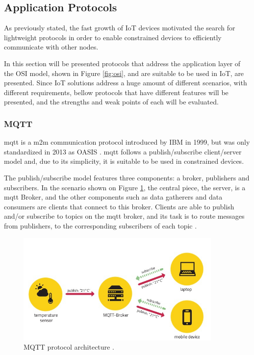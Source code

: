 \subsection{Application Protocols}

As previously stated, the fast growth of IoT devices motivated the search for lightweight protocols in order to enable constrained devices to efficiently communicate with other nodes.

In this section will be presented protocols that address the application layer of the OSI model, shown in Figure \ref{fig:osi}, and are suitable to be used in IoT, are presented. Since IoT solutions address a huge amount of different scenarios, with different requirements, bellow protocols that have different features will be presented, and the strengths and weak points of each will be evaluated.

\subsubsection{MQTT}

\acf{mqtt} is a \ac{m2m} communication protocol introduced by IBM in 1999, but was only standardized in 2013 as OASIS \cite{Al-fuqaha2015}. \ac{mqtt} follows a publish/subscribe client/server model and, due to its simplicity, it is suitable to be used in constrained devices.

The publish/subscribe model features three components: a broker, publishers and subscribers. In the scenario shown on Figure \ref{fig:mqtt}, the central piece, the server, is a \ac{mqtt} Broker, and the other components such as data gatherers and data consumers are clients that connect to this broker. Clients are able to publish and/or subscribe to topics on the \ac{mqtt} broker, and its task is to route messages from publishers, to the corresponding subscribers of each topic \cite{Al-fuqaha2015}. 

\begin{figure}[H]
	\centering
	\includegraphics[width=0.9\textwidth]{figures/mqtt.jpg}
	\caption{MQTT protocol architecture \cite{Turan}.}
	\label{fig:mqtt}
\end{figure}

